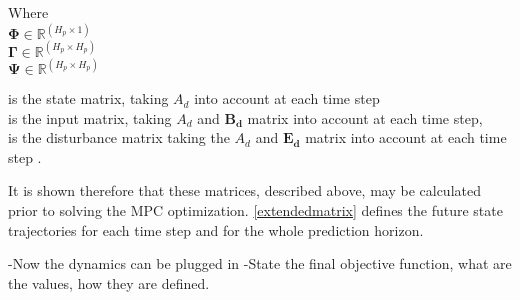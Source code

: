 
\begin{minipage}[t]{0.20\textwidth}
Where\\
\hspace*{8mm} $\bm{\Phi} \in \mathbb{R}^{(H_p \times 1)}$ \\
\hspace*{8mm} $\bm{\Gamma} \in \pmb{\mathbb{R}}^{(H_p \times H_p)}$ \\
\hspace*{8mm} $\bm{\Psi} \in \pmb{\mathbb{R}}^{(H_p \times H_p)}$ 
\end{minipage}
\begin{minipage}[t]{0.68\textwidth}
\vspace*{2mm}
is the state matrix, taking $A_d$ into account at each time step \\
is the input matrix, taking $A_d$ and $\bm{B_d}$ matrix into account at each time step, \\
is the disturbance matrix taking the $A_d$ and $\bm{E_d}$ matrix into account at each time step . \\ 
\end{minipage}

It is shown therefore that these matrices, described above, may be calculated prior to solving the MPC optimization. \eqref{extendedmatrix} defines the future state trajectories for each time step and for the whole prediction horizon.



-Now the dynamics can be plugged in
-State the final objective function, what are the values, how they are defined. 